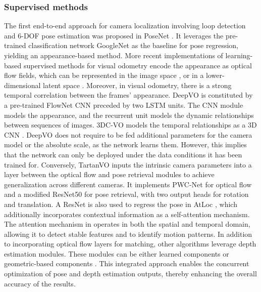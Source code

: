 \subsubsection{Supervised methods}
\label{sec:frontend:vo:supervised}
The first end-to-end approach for camera localization involving loop detection and 6-DOF pose estimation was proposed in PoseNet \cite{kendall2015posenet}. It leverages the pre-trained classification network GoogleNet \cite{szegedy2015googlenet} as the baseline for pose regression, yielding an appearance-based method. More recent implementations of learning-based supervised methods for visual  odometry encode the appearance as optical flow fields, which can be represented in the image space \cite{wang2017deepvo,wang2020tartanvo}, or in a lower-dimensional latent space \cite{costante2018lsvo}. 
Moreover, in visual odometry, there is a strong temporal correlation between the frames' appearance. DeepVO \cite{wang2017deepvo} is constituted by a pre-trained FlowNet \cite{dosovitskiy2015flownet} \ac{CNN} preceded by two \ac{LSTM} units. The \ac{CNN} module models the appearance, and the recurrent unit models the dynamic relationships between sequences of images. 3DC-VO models the temporal relationships as a 3D CNN \cite{dl:vo:3dcvo}.
DeepVO does not require to be fed additional parameters for the camera model or the absolute scale, as the network learns them. However, this implies that the network can only be deployed under the data conditions it has been trained for. 
Conversely, TartanVO \cite{wang2020tartanvo} inputs the intrinsic camera parameters into a layer between the optical flow and pose retrieval modules to achieve generalization across different cameras. It implements PWC-Net \cite{sun2018pwcnet} for optical flow and a modified ResNet50 \cite{dl:vo:2015resnet} for pose retrieval, with two output heads for rotation and translation. A ResNet is also used to regress the pose in AtLoc \cite{dl:vo:wang2020atloc}, which additionally incorporates contextual information as a self-attention mechanism. The attention mechanism in \cite{dl:vo:xue2019guidedatt} operates in both the spatial and temporal domain, allowing it to detect stable features and to identify motion patterns. 
In addition to incorporating optical flow layers for matching, other algorithms leverage depth estimation modules. These modules can be either learned components \cite{czarnowski2020deepfactors, zhou2018deeptam} or geometric-based components \mbox{\cite{dl:vo:droidslam}}. This integrated approach enables the concurrent optimization of pose and depth estimation outputs, thereby enhancing the overall accuracy of the results.

